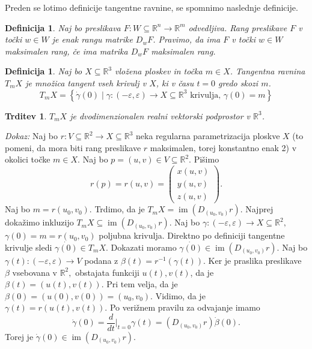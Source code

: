 \documentclass[10pt, a4paper]{article}
\newtheorem{trditev}[izr]{Trditev}
\newtheorem{defi}[izr]{Definicija}
\newenvironment{noticeB}{%
  \tcolorbox[%
  notitle,
  empty,
  enhanced,  %
  breakable,
  coltext=black,
  colback=white, 
  fontupper=\rmfamily,
  noparskip,
  sharp corners,
  boxrule=-1pt,  %
  frame hidden,
  left=7pt,  %
  right=7pt,
  top=5pt,
  bottom=5pt,
  before skip=2.5ex plus 2pt,
  after skip=2.5ex plus 2pt,
  borderline west = {1.5pt}{-0.1pt}{blue!30!black}, %
  overlay unbroken and last={%
    \draw[color=black, line width=1.25pt]
    ($(frame.south west)+(1.pt, -0.1pt)$) -- ++(2em, 0);
  }
  ]}
{\endtcolorbox}
\newenvironment{definicija}{\begin{noticeB}\begin{defi}}{%
\end{defi}\end{noticeB}}
\begin{document}
Preden se lotimo definicije tangentne ravnine, se spomnimo naslednje
definicije. 

\begin{definicija}
\label{def_rang_preslikave}
 Naj bo preslikava $F: W \subseteq  \mathbb{R}^n \to  \mathbb{R}^m$ odvedljiva.
 Rang preslikave $F$ v točki $w \in  W$ je enak rangu matrike $D_wF$. Pravimo,
 da ima $F$ v točki $w \in  W$ maksimalen rang, če ima matrika $D_wF$
 maksimalen rang.
\end{definicija}


\begin{definicija} 
	\label{def_tangentna_ravnina}
	Naj bo $X \subseteq \mathbb{R}^3$ vložena ploskev in točka $m
\in X$. Tangentna ravnina $T_mX$ je množica tangent
vseh krivulj v $X$, ki v času $t = 0$ gredo skozi $m$.
\[ T_mX = \left\{ \dot{\gamma}\left( 0 \right) \mid
\gamma : \left(  - \varepsilon, \varepsilon \right)
\to  X \subseteq  \mathbb{R}^3 \text{ krivulja, } \gamma\left(
0 \right) = m\right\} \]
\end{definicija}


\begin{trditev}
\label{trd_tangentna_ravnina_je_dvodimenzionalen_vektorski_prostor}
$T_mX$ je dvodimenzionalen realni vektorski podprostor v
$\mathbb{R}^3$. 
\end{trditev} \noident 
{\em Dokaz:\/} Naj bo $r : V
\subseteq  \mathbb{R}^2 \to X \subseteq \mathbb{R}^3$ neka regularna
parametrizacija ploskve $X$ (to pomeni, da mora biti rang preslikave
$r$ maksimalen, torej konstantno enak 2) v okolici točke  $m \in  X$. Naj
bo $p = \left( u, v \right) \in  V \subseteq \mathbb{R}^2.$ Pišimo \[ r\left(
p \right) = r\left( u,v \right) = 
\begin{pmatrix} x\left( u,v
\right) \\ y\left( u,v \right) \\ z\left( u,v \right)
\end{pmatrix} . \]
Naj bo $m = r\left( u_0, v_0 \right).$ Trdimo, da
je $ T_mX = \operatorname{im} \left( D_{(u_0, v_0)}r \right) $.
Najprej dokažimo inkluzijo $T_mX \subseteq \operatorname{im} \left(
D_{(u_0, v_0)}r \right)$. 
Naj bo $\gamma: \left( -\varepsilon,
\varepsilon \right) \to X \subseteq \mathbb{R}^2,$ $\gamma \left( 0
\right) = m = r\left( u_0, v_0 \right)$ poljubna krivulja. Direktno
po definiciji tangentne krivulje sledi $\dot{\gamma\left( 0 \right)}
\in T_mX$. 
Dokazati moramo $\dot{\gamma(0)} \in
\operatorname{im}\left(D_\left( u_0, v_0 \right)r  \right)$. Naj bo
$\gamma\left( t \right) : \left( -\varepsilon, \varepsilon \right)\to
V$ podana z $\beta\left( t \right) = r^{-1}\left( \gamma\left( t
\right) \right)$. Ker je praslika preslikave $\beta$ vsebovana v
$\mathbb{R}^2,$ obstajata funkciji $u\left( t \right), v\left( t
\right)$, da je $\beta\left( t \right) = \left( u(t), v(t) \right).$
Pri tem velja, da je $\beta(0) = (u(0), v(0)) = (u_0, v_0).$ Vidimo,
da je $\gamma(t) = r(u(t), v(t)).$ Po verižnem pravilu za odvajanje
imamo \[ \dot{\gamma }(0)= \frac{d}{dt} \big|_{t = 0} \gamma(t) =
\left( D_{ (u_0, v_0)}r \right) \dot{\beta} (0).\]Torej je
$\dot{\gamma} (0) \in \operatorname{im} \left( D_{(u_0,v_0)}r
\right).$ 
\end{document}
